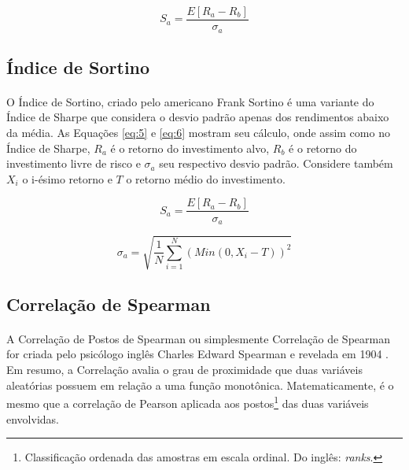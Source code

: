 \begin{equation} \label{eq:1}
    S_a = \frac{E[R_a - R_b]}{\sigma_a}
\end{equation}



\FloatBarrier
\subsection{Índice de Sortino}

\paragraph{} O Índice de Sortino, criado pelo americano Frank Sortino \cite{rollinger2013sortino} é uma variante do Índice de Sharpe que considera o desvio padrão apenas dos rendimentos abaixo da média. As Equações \ref{eq:5} e \ref{eq:6} mostram seu cálculo, onde assim como no Índice de Sharpe, \begin{math}R_a\end{math} é o retorno do investimento alvo, \begin{math}R_b\end{math} é o retorno do investimento livre de risco e \begin{math}\sigma_a\end{math} seu respectivo desvio padrão. Considere também \begin{math}X_i\end{math} o i-ésimo retorno e \begin{math}T\end{math} o retorno médio do investimento.

\begin{equation} \label{eq:5}
    S_a = \frac{E[R_a - R_b]}{\sigma_a}
\end{equation}

\begin{equation} \label{eq:6}
    \sigma_a = \sqrt{ \frac{1}{N} \sum_{i=1}^{N} (Min(0, X_i-T))^2}
\end{equation}



\FloatBarrier
\subsection{Correlação de Spearman}

\paragraph{} A Correlação de Postos de Spearman ou simplesmente Correlação de Spearman for criada pelo psicólogo inglês Charles Edward Spearman e revelada em 1904 \cite{spearman1961proof}. Em resumo, a Correlação avalia o grau de proximidade que duas variáveis aleatórias possuem em relação a uma função monotônica. Matematicamente, é o mesmo que a correlação de Pearson aplicada aos postos\footnote{Classificação ordenada das amostras em escala ordinal. Do inglês: \textit{ranks}.} das duas variáveis envolvidas.

